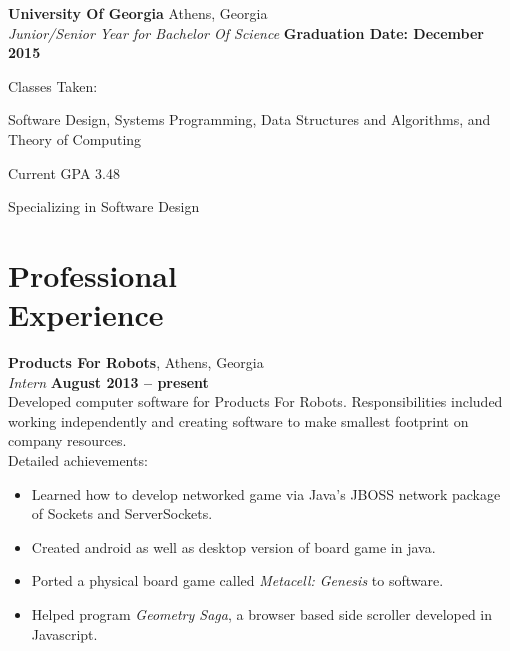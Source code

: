 \documentclass[margin,line]{resume}
\begin{document}
\begin{resume}
    \textbf{University Of Georgia} Athens, Georgia \vspace{2mm}\\\vspace{1mm}%
    \textsl{Junior/Senior Year for Bachelor Of Science} \hfill \textbf{Graduation Date: December 2015	}\vspace{-3mm}\\\vspace{-1mm}%
    \begin{list2}
        \item Classes Taken:
        	\begin{list2} 
        	\item Software Design, Systems Programming, Data Structures and Algorithms, and Theory of Computing
        	\end{list2}
        \item  Current GPA 3.48
        \item Specializing in Software Design
    \end{list2}\vspace{-1.5mm}


  
   \section{\mysidestyle Professional\\Experience}

    \textbf{Products For Robots}, Athens, Georgia \vspace{2mm}\\\vspace{1mm}%
    \textsl{Intern} \hfill \textbf{August 2013 -- present}\\
   Developed computer software for Products For Robots. Responsibilities included working independently and creating software to make smallest footprint on company resources.\\
Detailed achievements:
\begin{itemize}
\item Learned how to develop networked game via Java's JBOSS network package of Sockets and ServerSockets.
\item Created android as well as desktop version of board game in java.
\item Ported a physical board game called \textit{Metacell: Genesis} to software.
\item Helped program \textit{Geometry Saga}, a browser based side scroller developed in Javascript.
\end{itemize}



\end{resume}
\end{document}
